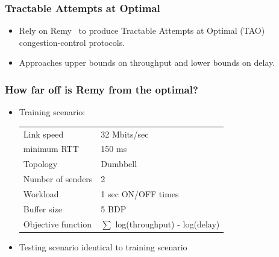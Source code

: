 \begin{frame}
\frametitle{Tractable Attempts at Optimal}
\begin{itemize}
\item Rely on Remy~\cite{remy} to produce Tractable Attempts at Optimal (TAO) congestion-control protocols.
\item Approaches upper bounds on throughput and lower bounds on delay.
\end{itemize}
\end{frame}

\begin{frame}
\frametitle{How far off is Remy from the optimal?}
\begin{itemize}
\item Training scenario:
\begin{tabular}{ll}
Link speed & 32 Mbits/sec \\
minimum RTT & 150 ms \\
Topology & Dumbbell \\
Number of senders & 2 \\
Workload & 1 sec ON/OFF times \\
Buffer size & 5 BDP \\
Objective function & $\sum$ log(throughput) - log(delay)
\end{tabular}
\item Testing scenario identical to training scenario
\end{itemize}
\end{frame}

